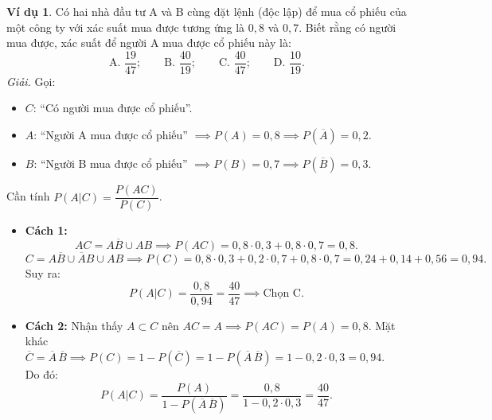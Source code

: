 \documentclass[12pt,a4paper]{article}
\theoremstyle{definition}
\newtheorem{vidu}{Ví dụ}[section]
\begin{document}
\begin{vidu}
Có hai nhà đầu tư A và B cùng đặt lệnh (độc lập) để mua cổ phiếu của một công ty với xác suất mua được tương ứng là $0{,}8$ và $0{,}7$. Biết rằng có người mua được, xác suất để người A mua được cổ phiếu này là:
\[
\text{A. } \frac{19}{47}; \qquad \text{B. } \frac{40}{19}; \qquad \text{C. } \frac{40}{47}; \qquad \text{D. } \frac{10}{19}.
\]
\textit{Giải.} Gọi:
\begin{itemize}
    \item $C$: ``Có người mua được cổ phiếu''.
    \item $A$: ``Người A mua được cổ phiếu'' $\implies P(A) = 0{,}8 \implies P(\overline{A}) = 0{,}2$.
    \item $B$: ``Người B mua được cổ phiếu'' $\implies P(B) = 0{,}7 \implies P(\overline{B}) = 0{,}3$.
\end{itemize}
Cần tính $P(A|C) = \dfrac{P(AC)}{P(C)}$.
\begin{itemize}
    \item \textbf{Cách 1:}
    \[
    AC = A\overline{B} \cup AB \implies P(AC) = 0{,}8 \cdot 0{,}3 + 0{,}8 \cdot 0{,}7 = 0{,}8.
    \]
    \[
    C = A\overline{B} \cup \overline{A}B \cup AB \implies P(C) = 0{,}8 \cdot 0{,}3 + 0{,}2 \cdot 0{,}7 + 0{,}8 \cdot 0{,}7 = 0{,}24 + 0{,}14 + 0{,}56 = 0{,}94.
    \]
    Suy ra:
    \[
    P(A|C) = \frac{0{,}8}{0{,}94} = \frac{40}{47} \implies \text{Chọn C.}
    \]
    \item \textbf{Cách 2:}
    Nhận thấy $A \subset C$ nên $AC = A \implies P(AC) = P(A) = 0{,}8$.
    Mặt khác $\overline{C} = \overline{A}\,\overline{B} \implies P(C) = 1 - P(\overline{C}) = 1 - P(\overline{A}\,\overline{B}) = 1 - 0{,}2 \cdot 0{,}3 = 0{,}94$.\\
    Do đó:
    \[
    P(A|C) = \frac{P(A)}{1 - P(\overline{A}\,\overline{B})} = \frac{0{,}8}{1 - 0{,}2 \cdot 0{,}3} = \frac{40}{47}.
    \]
\end{itemize}
\end{vidu}
\end{document}
